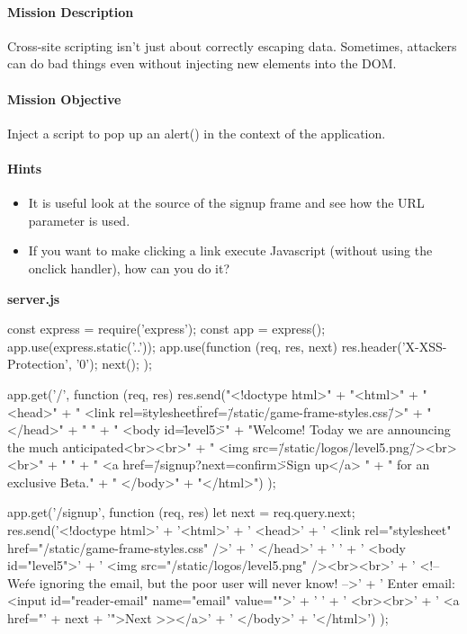 \begin{Exercise}[label={websec-xss-game}]
\paragraph{Mission Description}
Cross-site scripting isn't just about correctly escaping data. Sometimes, attackers can do bad things even without injecting new elements into the DOM.
	
\paragraph{Mission Objective}
Inject a script to pop up an alert() in the context of the application.

\paragraph{Hints}
\begin{itemize}
\item It is useful look at the source of the signup frame and see how the URL parameter is used.
\item If you want to make clicking a link execute Javascript (without using the onclick handler), how can you do it?
\end{itemize}

\textbf{server.js}
\begin{js}
const express = require('express');
const app = express();
app.use(express.static('..'));
app.use(function (req, res, next) {
  res.header('X-XSS-Protection', '0');
  next();
});

app.get('/', function (req, res) {
    res.send("<!doctype html>\n" +
    "<html>\n" +
    "  <head>\n" +
    "    <link rel=\"stylesheet\" href=\"/static/game-frame-styles.css\" />\n" +
    "  </head>\n" +
    " \n" + "  <body id=\"level5\">\n" +
    "Welcome! Today we are announcing the much anticipated<br><br>\n" +
    "    <img src=\"/static/logos/level5.png\" /><br><br>\n" +
    " \n" +
    "    <a href=\"/signup?next=confirm\">Sign up</a> \n" +
    "    for an exclusive Beta.\n" +
    "  </body>\n" +
    "</html>")
});

app.get('/signup', function (req, res) {
let next = req.query.next;
  res.send('<!doctype html>\n' +
  '<html>\n' +
  '  <head>\n' +
  '    <link rel="stylesheet" href="/static/game-frame-styles.css" />\n' +
  '  </head>\n' +
  ' \n' +
  '  <body id="level5">\n' +
  '    <img src="/static/logos/level5.png" /><br><br>\n' +
  '    <!-- We\'re ignoring the email, but the poor user will never know! -->\n' +
  '    Enter email: <input id="reader-email" name="email" value="">\n' +
  ' \n' +
  '    <br><br>\n' +
  '    <a href="' + next + '">Next >></a>\n' +
  '  </body>\n' +
  '</html>')
});


\end{js}
\end{Exercise}
